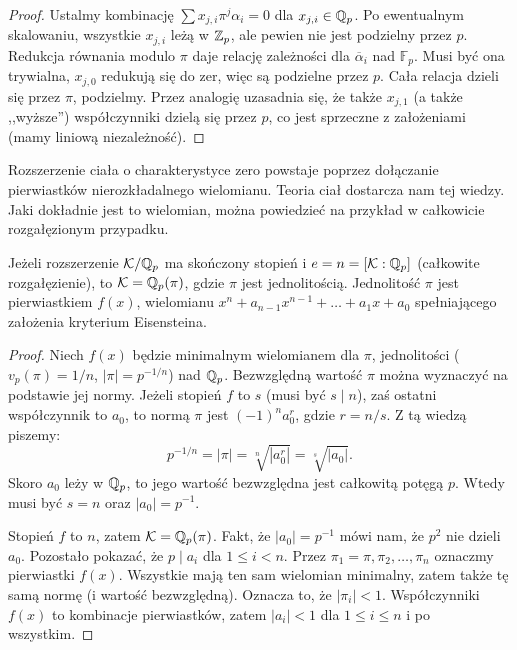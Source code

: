 \begin{proof}
	Ustalmy kombinację $\sum x_{j,i} \pi^j \alpha_i = 0$ dla $x_{j,i} \in \mathbb Q_p$.
	Po ewentualnym skalowaniu, wszystkie $x_{j,i}$ leżą w $\mathbb Z_p$, ale pewien nie jest podzielny przez $p$.
	Redukcja równania modulo $\pi$ daje relację zależności dla $\overline \alpha_i$ nad $\mathbb F_p$.
	Musi być ona trywialna, $x_{j,0}$ redukują się do zer, więc są podzielne przez $p$.
	Cała relacja dzieli się przez $\pi$, podzielmy.
	Przez analogię uzasadnia się, że także $x_{j,1}$ (a także ,,wyższe'') współczynniki dzielą się przez $p$, co jest sprzeczne z założeniami (mamy liniową niezależność).
\end{proof}

Rozszerzenie ciała o charakterystyce zero powstaje poprzez dołączanie pierwiastków nierozkładalnego wielomianu.
Teoria ciał dostarcza nam tej wiedzy.
Jaki dokładnie jest to wielomian, można powiedzieć na przykład w całkowicie rozgałęzionym przypadku.

\begin{fakt}
	Jeżeli rozszerzenie $\mathcal K / \mathbb Q_p$ ma skończony stopień i $e = n = [\mathcal K : \mathbb Q_p]$ (całkowite rozgałęzienie), to $\mathcal K = \mathbb Q_p(\pi)$, gdzie $\pi$ jest jednolitością.
	Jednolitość $\pi$ jest pierwiastkiem $f(x)$, wielomianu $x^n + a_{n-1} x^{n-1} + \ldots + a_1 x + a_0$ spełniającego założenia  kryterium Eisensteina.
\end{fakt}

\begin{proof}
	Niech $f(x)$ będzie minimalnym wielomianem dla $\pi$, jednolitości ($v_p(\pi) = 1/n$, $|\pi| = p^{-1/n}$) nad $\mathbb Q_p$.
	Bezwzględną wartość $\pi$ można wyznaczyć na podstawie jej normy.
	Jeżeli stopień $f$ to $s$ (musi być $s \mid n$), zaś ostatni współczynnik to $a_0$, to normą $\pi$ jest $(-1)^n a_0^r$, gdzie $r = n/s$.
	Z tą wiedzą piszemy:
	\[
		p^{-1/n} = |\pi| = \sqrt[n]{|a_0^r|} = \sqrt[s]{|a_0|}.
	\]
	Skoro $a_0$ leży w $\mathbb Q_p$, to jego wartość bezwzględna jest całkowitą potęgą $p$.
	Wtedy musi być $s = n$ oraz $|a_0| = p^{-1}$.

	Stopień $f$ to $n$, zatem $\mathcal K = \mathbb Q_p(\pi)$.
	Fakt, że $|a_0| = p^{-1}$ mówi nam, że $p^2$ nie dzieli $a_0$.
	Pozostało pokazać, że $p \mid a_i$ dla $1 \le i < n$.
	Przez $\pi_1 = \pi, \pi_2, \dots, \pi_n$ oznaczmy pierwiastki $f(x)$.
	Wszystkie mają ten sam wielomian minimalny, zatem także tę samą normę (i wartość bezwzględną).
	Oznacza to, że $|\pi_i| < 1$.
	Współczynniki $f(x)$ to kombinacje pierwiastków, zatem $|a_i| < 1$ dla $1 \le i \le n$ i po wszystkim.
\end{proof}

